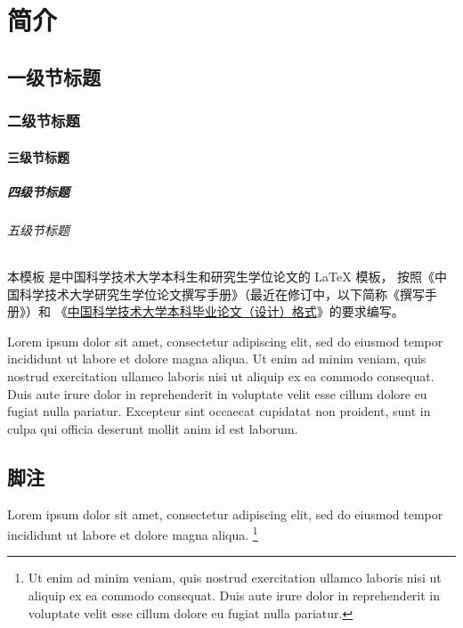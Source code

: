 
\chapter{简介}

\section{一级节标题}

\subsection{二级节标题}

\subsubsection{三级节标题}

\paragraph{四级节标题}

\subparagraph{五级节标题}

本模板  是中国科学技术大学本科生和研究生学位论文的 \LaTeX{}
模板， 按照《中国科学技术大学研究生学位论文撰写手册》（最近在修订中，以下简称《撰写手册》）和
《\href{https://www.teach.ustc.edu.cn/?attachment_id=13867}
{中国科学技术大学本科毕业论文（设计）格式}》的要求编写。

Lorem ipsum dolor sit amet, consectetur adipiscing elit, sed do eiusmod tempor
incididunt ut labore et dolore magna aliqua.
Ut enim ad minim veniam, quis nostrud exercitation ullamco laboris nisi ut
aliquip ex ea commodo consequat.
Duis aute irure dolor in reprehenderit in voluptate velit esse cillum dolore eu
fugiat nulla pariatur.
Excepteur sint occaecat cupidatat non proident, sunt in culpa qui officia
deserunt mollit anim id est laborum.



\section{脚注}

Lorem ipsum dolor sit amet, consectetur adipiscing elit, sed do eiusmod tempor
incididunt ut labore et dolore magna aliqua.
\footnote{Ut enim ad minim veniam, quis nostrud exercitation ullamco laboris
  nisi ut aliquip ex ea commodo consequat.
  Duis aute irure dolor in reprehenderit in voluptate velit esse cillum dolore
  eu fugiat nulla pariatur.}
